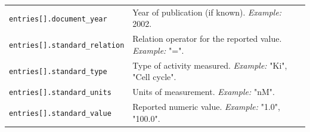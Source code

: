 \documentclass{article}
\begin{document}
\begin{table}[!htbp]
\begin{center}
\begin{tabularx}{\textwidth}{p{6cm}X}
\addlinespace
\texttt{entries[].document\_year} & Year of publication (if known). \emph{Example:} 2002. \\
\addlinespace
\texttt{entries[].standard\_relation} & Relation operator for the reported value. \emph{Example:} "=". \\
\addlinespace
\texttt{entries[].standard\_type} & Type of activity measured. \emph{Example:} "Ki", "Cell cycle". \\
\addlinespace
\texttt{entries[].standard\_units} & Units of measurement. \emph{Example:} "nM". \\
\addlinespace
\texttt{entries[].standard\_value} & Reported numeric value. \emph{Example:} "1.0", "100.0". \\
\bottomrule
\end{tabularx}
\end{center}
\end{table}
\end{document}
